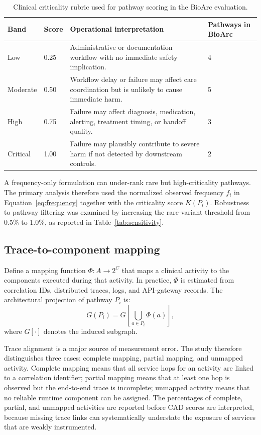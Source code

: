 \documentclass[english,preprint]{elsarticle}
\newcommand{\CAD}{\textsc{CAD}\xspace}
\begin{document}
\begin{table}[htbp]
\caption{Clinical criticality rubric used for pathway scoring in the BioArc evaluation.}
\label{tab:criticality}
\small
\begin{tabularx}{\textwidth}{@{}p{}p{}Y p{0.12\textwidth}@{}}
\toprule
\textbf{Band} & \textbf{Score} & \textbf{Operational interpretation} & \textbf{Pathways in BioArc} \\
\midrule
Low & 0.25 & Administrative or documentation workflow with no immediate safety implication. & 4 \\
Moderate & 0.50 & Workflow delay or failure may affect care coordination but is unlikely to cause immediate harm. & 5 \\
High & 0.75 & Failure may affect diagnosis, medication, alerting, treatment timing, or handoff quality. & 3 \\
Critical & 1.00 & Failure may plausibly contribute to severe harm if not detected by downstream controls. & 2 \\
\bottomrule
\end{tabularx}
\end{table}

A frequency-only formulation can under-rank rare but high-criticality pathways. The primary analysis therefore used the normalized observed frequency $f_i$ in Equation~\eqref{eq:frequency} together with the criticality score $K(P_i)$. Robustness to pathway filtering was examined by increasing the rare-variant threshold from 0.5\% to 1.0\%, as reported in Table~\ref{tab:sensitivity}.

\subsection{Trace-to-component mapping}

Define a mapping function $\Phi:A\rightarrow 2^C$ that maps a clinical activity to the components executed during that activity. In practice, $\Phi$ is estimated from correlation IDs, distributed traces, logs, and API-gateway records. The architectural projection of pathway $P_i$ is:
\begin{equation}
G(P_i)=G\!\left[\bigcup_{a\in P_i}\Phi(a)\right],
\label{eq:projection}
\end{equation}
where $G[\cdot]$ denotes the induced subgraph.

Trace alignment is a major source of measurement error. The study therefore distinguishes three cases: complete mapping, partial mapping, and unmapped activity. Complete mapping means that all service hops for an activity are linked to a correlation identifier; partial mapping means that at least one hop is observed but the end-to-end trace is incomplete; unmapped activity means that no reliable runtime component can be assigned. The percentages of complete, partial, and unmapped activities are reported before \CAD scores are interpreted, because missing trace links can systematically understate the exposure of services that are weakly instrumented.
\end{document}
